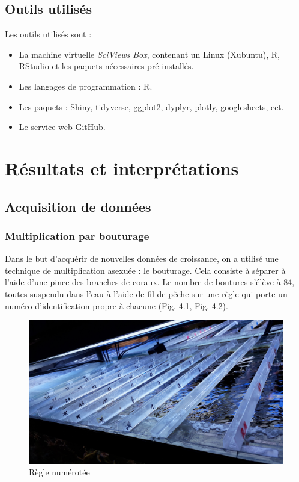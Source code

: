 \documentclass[]{report}
\begin{document}
\section{Outils utilisés}\label{outils-utilises}

Les outils utilisés sont :

\begin{itemize}
\item
  La machine virtuelle \emph{SciViews Box}, contenant un Linux
  (Xubuntu), R, RStudio et les paquets nécessaires pré-installés.
\item
  Les langages de programmation : R.
\item
  Les paquets : Shiny, tidyverse, ggplot2, dyplyr, plotly, googlesheets,
  ect.
\item
  Le service web GitHub.
\end{itemize}

\chapter{Résultats et
interprétations}\label{resultats-et-interpretations}

\section{Acquisition de données}\label{acquisition-de-donnees}

\subsection{Multiplication par
bouturage}\label{multiplication-par-bouturage}

Dans le but d'acquérir de nouvelles données de croissance, on a utilisé
une technique de multiplication asexuée : le bouturage. Cela consiste à
séparer à l'aide d'une pince des branches de coraux. Le nombre de
boutures s'élève à 84, toutes suspendu dans l'eau à l'aide de fil de
pêche sur une règle qui porte un numéro d'identification propre à
chacune (Fig. 4.1, Fig. 4.2).

\begin{figure}[h!]
\includegraphics[]{../image/regle.jpg}
\caption{Règle numérotée}
\end{figure}
\end{document}
